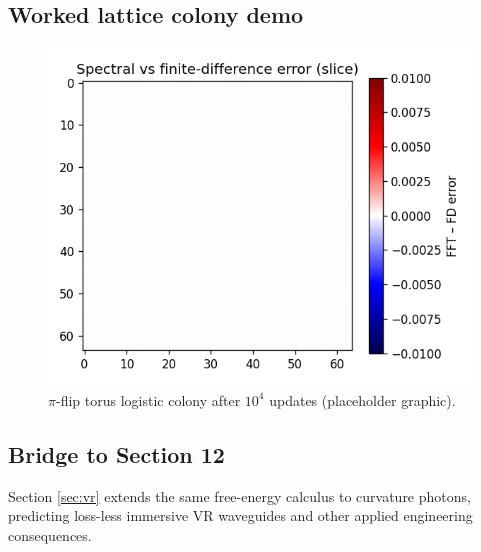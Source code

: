 \subsection{Worked lattice colony demo}

\begin{figure}[t]
  \centering
  \includegraphics[width=\linewidth]{figs/lattice_colony.png}
  \caption{$\pi$-flip torus logistic colony after $10^4$ updates
           (placeholder graphic).}
  \label{fig:colony}
\end{figure}

\subsection{Bridge to Section 12}

Section \ref{sec:vr} extends the same free-energy calculus to curvature
photons, predicting loss-less immersive VR waveguides and other applied
engineering consequences.

\clearpage
